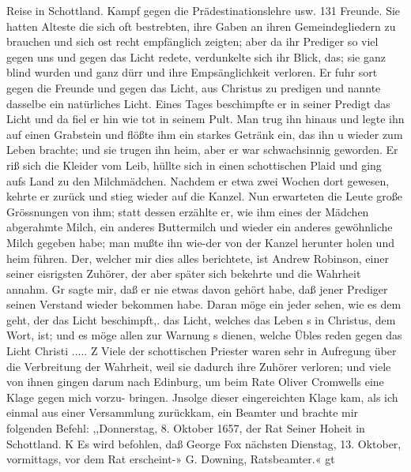 Reise in Schottland. Kampf gegen die Prädestinationslehre usw. 131
Freunde. Sie hatten Alteste die sich oft bestrebten, ihre Gaben
an ihren Gemeindegliedern zu brauchen und sich ost recht empfänglich
zeigten; aber da ihr Prediger so viel gegen uns und gegen das
Licht redete, verdunkelte sich ihr Blick, das; sie ganz blind wurden
und ganz dürr und ihre Empsänglichkeit verloren. Er fuhr sort
gegen die Freunde und gegen das Licht, aus Christus zu
predigen und nannte dasselbe ein natürliches Licht. Eines Tages
beschimpfte er in seiner Predigt das Licht und da fiel er hin wie
tot in seinem Pult. Man trug ihn hinaus und legte ihn auf
einen Grabstein und flößte ihm ein starkes Getränk ein, das ihn u
wieder zum Leben brachte; und sie trugen ihn heim, aber er war
schwachsinnig geworden. Er riß sich die Kleider vom Leib, hüllte
sich in einen schottischen Plaid und ging aufs Land zu den
Milchmädchen. Nachdem er etwa zwei Wochen dort gewesen,
kehrte er zurück und stieg wieder auf die Kanzel. Nun erwarteten
die Leute große Grössnungen von ihm; statt dessen erzählte er,
wie ihm eines der Mädchen abgerahmte Milch, ein anderes
Buttermilch und wieder ein anderes gewöhnliche Milch gegeben
habe; man mußte ihn wie-der von der Kanzel herunter holen und
heim führen. Der, welcher mir dies alles berichtete, ist Andrew
Robinson, einer seiner eisrigsten Zuhörer, der aber später sich
bekehrte und die Wahrheit annahm. Gr sagte mir, daß er nie
etwas davon gehört habe, daß jener Prediger seinen Verstand
wieder bekommen habe. Daran möge ein jeder sehen, wie es
dem geht, der das Licht beschimpft,. das Licht, welches das Leben s
in Christus, dem Wort, ist; und es möge allen zur Warnung s
dienen, welche Übles reden gegen das Licht Christi ..... Z
Viele der schottischen Priester waren sehr in Aufregung über
die Verbreitung der Wahrheit, weil sie dadurch ihre Zuhörer
verloren; und viele von ihnen gingen darum nach Edinburg,
um beim Rate Oliver Cromwells eine Klage gegen mich vorzu-
bringen. Jnsolge dieser eingereichten Klage kam, als ich einmal
aus einer Versammlung zurückkam, ein Beamter und brachte mir
folgenden Befehl:
,,Donnerstag, 8. Oktober 1657, der Rat Seiner Hoheit in
Schottland.
K Es wird befohlen, daß George Fox nächsten Dienstag,
13. Oktober, vormittags, vor dem Rat erscheint-»
G. Downing, Ratsbeamter.«
gt


